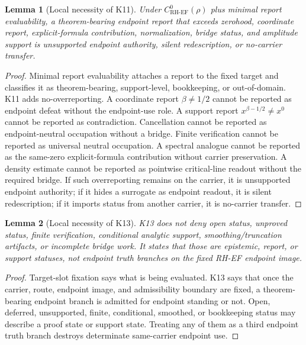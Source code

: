 \documentclass[11pt]{article}
\newtheorem{lemma}{Lemma}[section]
\newcommand{\CoreRHEF}{C^{0}_{\mathrm{RH}\text{-}\mathrm{EF}}}
\begin{document}
\begin{lemma}[Local necessity of K11]
Under \(\CoreRHEF(\rho)\) plus minimal report evaluability, a theorem-bearing endpoint report that exceeds zerohood, coordinate report, explicit-formula contribution, normalization, bridge status, and amplitude support is unsupported endpoint authority, silent redescription, or no-carrier transfer.
\end{lemma}

\begin{proof}
Minimal report evaluability attaches a report to the fixed target and classifies it as theorem-bearing, support-level, bookkeeping, or out-of-domain.  K11 adds no-overreporting.  A coordinate report \(\beta\ne1/2\) cannot be reported as endpoint defeat without the endpoint-use role.  A support report \(x^{\beta-1/2}\ne x^0\) cannot be reported as contradiction.  Cancellation cannot be reported as endpoint-neutral occupation without a bridge.  Finite verification cannot be reported as universal neutral occupation.  A spectral analogue cannot be reported as the same-zero explicit-formula contribution without carrier preservation.  A density estimate cannot be reported as pointwise critical-line readout without the required bridge.  If such overreporting remains on the carrier, it is unsupported endpoint authority; if it hides a surrogate as endpoint readout, it is silent redescription; if it imports status from another carrier, it is no-carrier transfer.
\end{proof}

\begin{lemma}[Local necessity of K13]
K13 does not deny open status, unproved status, finite verification, conditional analytic support, smoothing/truncation artifacts, or incomplete bridge work.  It states that those are epistemic, report, or support statuses, not endpoint truth branches on the fixed RH-EF endpoint image.
\end{lemma}

\begin{proof}
Target-slot fixation says what is being evaluated.  K13 says that once the carrier, route, endpoint image, and admissibility boundary are fixed, a theorem-bearing endpoint branch is admitted for endpoint standing or not.  Open, deferred, unsupported, finite, conditional, smoothed, or bookkeeping status may describe a proof state or support state.  Treating any of them as a third endpoint truth branch destroys determinate same-carrier endpoint use.
\end{proof}
\end{document}
